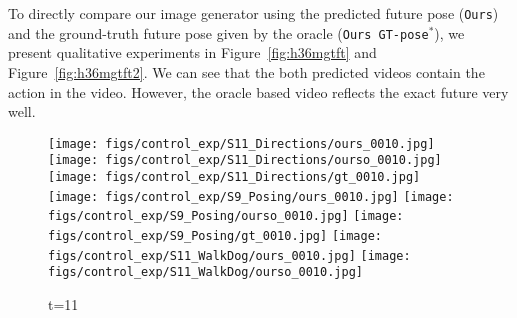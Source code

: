 \documentclass{article}
\begin{document}
\begin{appendix}
\clearpage
To directly compare our image generator using the predicted future pose (\texttt{Ours}) and the ground-truth future pose given by the oracle (\texttt{Ours GT-pose$^*$}), we present qualitative experiments in Figure~\ref{fig:h36mgtft} and Figure~\ref{fig:h36mgtft2}.
We can see that the both predicted videos contain the action in the video. However, the oracle based video reflects the exact future very well.

\begin{figure*}[!thbp]
    \centering
    \vspace{20pt}
	\begin{subfigure}{0.04\linewidth}
        \raggedleft
    \end{subfigure}
    \begin{subfigure}{0.12\linewidth}
        \caption*{t=11}
        \vspace{-7pt}
	    \texttt{[image: figs/control\_exp/S11\_Directions/ours\_0010.jpg]}
	    \texttt{[image: figs/control\_exp/S11\_Directions/ourso\_0010.jpg]}
	    \vspace{.2cm}
  		\texttt{[image: figs/control\_exp/S11\_Directions/gt\_0010.jpg]}
  		\texttt{[image: figs/control\_exp/S9\_Posing/ours\_0010.jpg]}
  		\texttt{[image: figs/control\_exp/S9\_Posing/ourso\_0010.jpg]}
  		\vspace{.2cm}
  		\texttt{[image: figs/control\_exp/S9\_Posing/gt\_0010.jpg]}
  		\texttt{[image: figs/control\_exp/S11\_WalkDog/ours\_0010.jpg]}
  		\texttt{[image: figs/control\_exp/S11\_WalkDog/ourso\_0010.jpg]}
  		\vspace{.2cm}

\end{subfigure}
\end{figure*}
\end{appendix}
\end{document}
